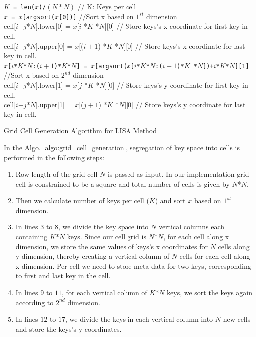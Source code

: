 \begin{algorithm}[H]
    \SetAlgoLined
     \texttt{$K$ =  len($x$)\slash$(N * N) $} // K: Keys per cell \\
      \texttt{$x$ = $x$[argsort($x$[0])]} //Sort x based on $1^{st}$ dimension \\
      {
         {
           cell[$i$+$j$*$N$].lower[0] = $x$[$i$ *$K$ *$N$][0] // Store keys's x coordinate for first key in cell.\\
           cell[$i$+$j$*$N$].upper[0] = $x$[($i+1$) *$K$ *$N$][0] // Store keys's x coordinate for last key in cell.\\
		 }
      }
     {
        \texttt{$x$[$i$*$K$*$N$:($i+1$)*$K$*$N$] = $x$[argsort($x$[$i$*$K$*$N$:($i+1$)*$K$ *$N$])+$i$*$K$*$N$][1]} //Sort x based on $2^{nd}$ dimension \\
     } 
      {
         {
            cell[$i$+$j$*$N$].lower[1] = $x$[$j$ *$K$ *$N$][0] // Store keys's y coordinate for first key in cell.\\
            cell[$i$+$j$*$N$].upper[1] = $x$[($j+1$) *$K$ *$N$][0] // Store keys's y coordinate for last key in cell.\\
		 }
      }
     \caption{Grid Cell Generation Algorithm for LISA Method}
     \label{algo:grid_cell_generation}
\end{algorithm}

In the Algo. \ref{algo:grid_cell_generation},  segregation of key space into cells is performed in the following steps:

\begin{enumerate}
	\item Row length of the grid cell $N$ is passed as input. In our implementation grid cell is constrained to be a square and total number of cells is given by $N$*$N$.
	\item  Then we calculate number of keys per cell ($K$) and sort $x$ based on $1^{st}$ dimension.
	\item In lines $3$ to $8$, we divide the key space into $N$ vertical columns each containing $K$*$N$ keys. Since our cell grid is $N$*$N$, for each cell along x dimension, we store the same values of keys's x coordinates for $N$ cells along y dimension, thereby creating a vertical column of $N$ cells for each cell along x dimension. Per cell we need to store meta data for two keys, corresponding to first and last key in the cell. 
	
	\item In lines $9$ to $11$, for each vertical column of $K$*$N$ keys, we sort the keys again according to $2^{nd}$ dimension.
	\item In lines $12$ to $17$, we divide the keys in each vertical column into $N$ new cells and store the keys's y coordinates.
\end{enumerate}



